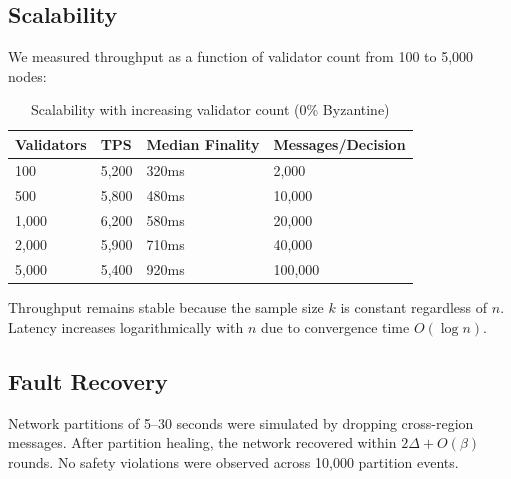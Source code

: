 \subsection{Scalability}

We measured throughput as a function of validator count from 100 to 5,000 nodes:

\begin{table}[h]
\centering
\caption{Scalability with increasing validator count (0\% Byzantine)}
\label{tab:scalability}
\begin{tabular}{@{}llll@{}}
\toprule
Validators & TPS & Median Finality & Messages/Decision \\
\midrule
100 & 5,200 & 320ms & 2,000 \\
500 & 5,800 & 480ms & 10,000 \\
1,000 & 6,200 & 580ms & 20,000 \\
2,000 & 5,900 & 710ms & 40,000 \\
5,000 & 5,400 & 920ms & 100,000 \\
\bottomrule
\end{tabular}
\end{table}

Throughput remains stable because the sample size $k$ is constant regardless of $n$. Latency
increases logarithmically with $n$ due to convergence time $O(\log n)$.

\subsection{Fault Recovery}

Network partitions of 5--30 seconds were simulated by dropping cross-region messages.
After partition healing, the network recovered within $2\Delta + O(\beta)$ rounds. No safety
violations were observed across 10,000 partition events.

